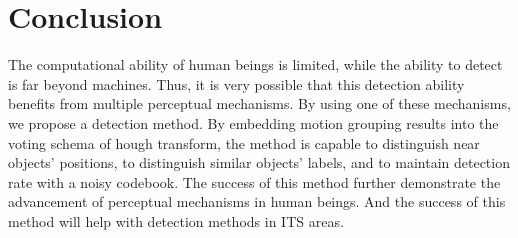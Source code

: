 \section{Conclusion}
\label{sum4}
The computational ability of human beings is limited, while the ability to detect is far beyond machines. Thus, it is very possible that this detection ability benefits from multiple perceptual mechanisms. By using one of these mechanisms, we propose a detection method. By embedding motion grouping results into the voting schema of hough transform, the method is capable to distinguish near objects' positions, to distinguish similar objects' labels, and to maintain detection rate with a noisy codebook. The success of this method further demonstrate the advancement of perceptual mechanisms in human beings. And the success of this method will help with detection methods in ITS areas.

